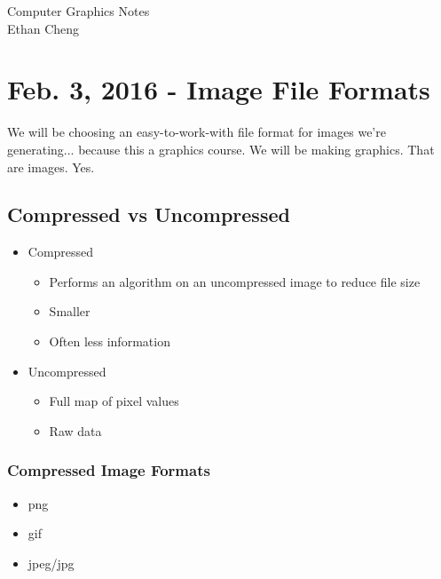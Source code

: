\documentclass[11pt,fleqn]{article}
\theoremstyle{definition}
\begin{document}
\begin{center}
    {\Huge
        Computer Graphics Notes %
    }\\
    Ethan Cheng %
\end{center}

\begin{abstract} \noindent
    Computer Graphics Programming, taught by Jon-Alf Dyrland-Weaver
\end{abstract}

\tableofcontents

\newpage
\section{Feb. 3, 2016 - Image File Formats}
We will be choosing an easy-to-work-with file format for images we're generating...
because this a graphics course. We will be making graphics. That are images. Yes.

\subsection{Compressed vs Uncompressed}
\begin{itemize}
    \item Compressed
        \begin{itemize}
            \item Performs an algorithm on an uncompressed image to reduce file size
            \item Smaller
            \item Often less information
        \end{itemize}
    \item Uncompressed
        \begin{itemize}
            \item Full map of pixel values
            \item Raw data
        \end{itemize}
\end{itemize}

\subsubsection{Compressed Image Formats}
\begin{itemize}
    \item png
    \item gif
    \item jpeg/jpg
\end{itemize}
\end{document}
